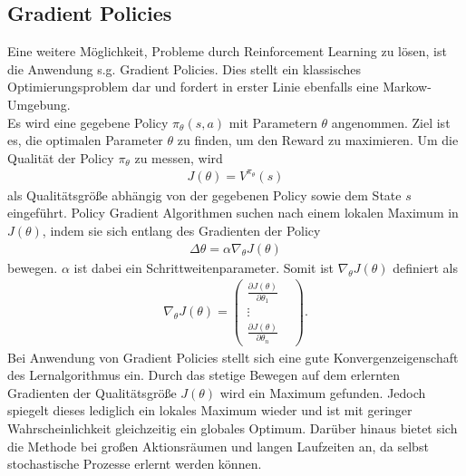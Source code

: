 	\subsection{Gradient Policies}
		Eine weitere Möglichkeit, Probleme durch Reinforcement Learning zu lösen, ist die Anwendung s.g. \glqq Gradient Policies\grqq{}. Dies stellt ein klassisches Optimierungsproblem dar und fordert in erster Linie ebenfalls eine Markow-Umgebung.\\
		Es wird eine gegebene Policy $\pi_\theta(s,a)$ mit Parametern $\theta$ angenommen. Ziel ist es, die optimalen Parameter $\theta$ zu finden, um den Reward zu maximieren. Um die Qualität der Policy $\pi_\theta$ zu messen, wird
		\begin{align}
			J(\theta) = V^{\pi_\theta}(s)
		\end{align}
		als Qualitätsgröße abhängig von der gegebenen Policy sowie dem State $s$ eingeführt. Policy Gradient Algorithmen suchen nach einem lokalen Maximum in $J(\theta)$, indem sie sich entlang des Gradienten der Policy 
		\begin{align}
			\Delta \theta = \alpha \nabla_\theta J(\theta)
		\end{align}
		bewegen. $\alpha$ ist dabei ein Schrittweitenparameter.	Somit ist $\nabla_\theta J(\theta)$ definiert als
		\begin{align}
			\nabla_\theta J(\theta) = \begin{pmatrix}
			\frac{\partial J(\theta)}{\partial \theta_1} & \\
			\vdots & \\
			\frac{\partial J(\theta)}{\partial \theta_n} & \end{pmatrix}.
		\end{align}
		Bei Anwendung von Gradient Policies stellt sich eine gute Konvergenzeigenschaft des Lernalgorithmus ein. Durch das stetige Bewegen auf dem erlernten Gradienten der Qualitätsgröße $J(\theta)$ wird ein Maximum gefunden. Jedoch spiegelt dieses lediglich ein lokales Maximum wieder und ist mit geringer Wahrscheinlichkeit gleichzeitig ein globales Optimum. Darüber hinaus bietet sich die Methode bei großen Aktionsräumen und langen Laufzeiten an, da selbst stochastische Prozesse erlernt werden können. \cite{SilverRL} 
